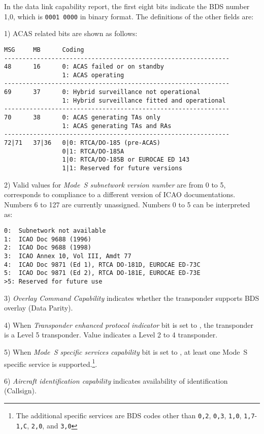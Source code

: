 In the data link capability report, the first eight bits indicate the BDS number 1,0, which is \texttt{0001 0000} in binary format. The definitions of the other fields are:

1) ACAS related bits are shown as follows:

\begin{verbatim}
MSG     MB      Coding
--------------------------------------------------------------
48      16      0: ACAS failed or on standby
                1: ACAS operating
--------------------------------------------------------------
69      37      0: Hybrid surveillance not operational
                1: Hybrid surveillance fitted and operational
--------------------------------------------------------------
70      38      0: ACAS generating TAs only
                1: ACAS generating TAs and RAs
--------------------------------------------------------------
72|71   37|36   0|0: RTCA/DO-185 (pre-ACAS)
                0|1: RTCA/DO-185A
                1|0: RTCA/DO-185B or EUROCAE ED 143
                1|1: Reserved for future versions
\end{verbatim}

2) Valid values for \emph{Mode~S subnetwork version number} are from 0 to 5, corresponds to compliance to a different version of ICAO documentations. Numbers 6 to 127 are currently unassigned. Numbers 0 to 5 can be interpreted as:

\begin{verbatim}
0:  Subnetwork not available
1:  ICAO Doc 9688 (1996)
2:  ICAO Doc 9688 (1998)
3:  ICAO Annex 10, Vol III, Amdt 77
4:  ICAO Doc 9871 (Ed 1), RTCA DO-181D, EUROCAE ED-73C
5:  ICAO Doc 9871 (Ed 2), RTCA DO-181E, EUROCAE ED-73E
>5: Reserved for future use
\end{verbatim}

3) \emph{Overlay Command Capability} indicates whether the transponder supports BDS overlay (Data Parity).

4) When \emph{Transponder enhanced protocol indicator} bit is set to \1, the transponder is a Level 5 transponder. Value \0 indicates a Level 2 to 4 transponder.

5) When \emph{Mode~S specific services capability} bit is set to \1, at least one Mode~S specific service is supported.\footnote{The additional specific services are BDS codes other than \texttt{0,2}, \texttt{0,3}, \texttt{1,0}, \texttt{1,7}-\texttt{1,C}, \texttt{2,0}, and \texttt{3,0}}.

6) \emph{Aircraft identification capability} indicates availability of identification (Callsign).

